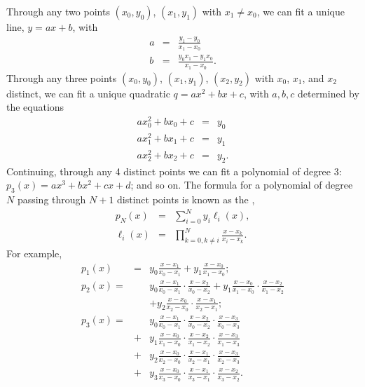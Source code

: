 \begin{sidebar}[Interpolation]
\label{sb.interpolation}
\noindent Through any two points $(x_{0},y_{0})$, $(x_{1},y_{1})$ with $x_{1}\neq x_{0}$, we can fit a unique line, $y=ax+b$, with
\begin{eqnarray*}
	a &=&  \frac{y_{1}-y_{0}}{x_{1}-x_{0}}\\
	b &=&  \frac{y_{0}x_{1} - y_{1}x_{0}}{x_{1}-x_{0}}.
\end{eqnarray*}
Through any three points $(x_{0},y_{0})$, $(x_{1},y_{1})$, $(x_{2},y_{2})$ with $x_{0}$, $x_{1}$, and $x_{2}$ distinct, we can fit a unique quadratic $q = ax^{2}+bx+c$, with $a,b,c$ determined by the equations
\begin{eqnarray*}
a x_{0}^{2} + b x_{0} + c &=& y_{0}\\
a x_{1}^{2} + b x_{1} + c &=& y_{1}\\
a x_{2}^{2} + b x_{2} + c &=& y_{2}.
\end{eqnarray*}
Continuing, through any 4 distinct points we can fit a polynomial of degree 3: $p_{3}(x) = ax^{3} + bx^{2} + cx +d$; and so on. The formula for a polynomial of degree $N$ passing through $N+1$ distinct points is known as the , 
\begin{eqnarray}
p_{N}(x) &=& \sum_{i=0}^{N} y_{i}\ell_{i}(x),\\
\ell_{i}(x) &=& \prod_{k=0,k\neq i}^{N} \frac{x-x_{k}}{x_{i}-x_{k}}.
\end{eqnarray}
For example,
\begin{eqnarray}
\label{e.lagrange-one}
p_{1}(x) &=& y_{0}\frac{x-x_{1}}{x_{0}-x_{1}} + y_{1}\frac{x-x_{0}}{x_{1}-x_{0}};\\
\label{e.lagrange-three}
p_{2}(x) =&& y_{0}\frac{x-x_{1}}{x_{0}-x_{1}}\cdot\frac{x-x_{2}}{x_{0}-x_{2}} 
	+ y_{1}\frac{x-x_{0}}{x_{1}-x_{0}}\cdot\frac{x-x_{2}}{x_{1}-x_{2}}\nonumber\\
	&&+ y_{2}\frac{x-x_{0}}{x_{2}-x_{0}}\cdot\frac{x-x_{1}}{x_{2}-x_{1}};\\
\label{e.lagrange-four}
p_{3}(x) =&&  y_{0}\frac{x-x_{1}}{x_{0}-x_{1}}\cdot\frac{x-x_{2}}{x_{0}-x_{2}}\cdot\frac{x-x_{3}}{x_{0}-x_{3}} \nonumber\\
      &+& y_{1}\frac{x-x_{0}}{x_{1}-x_{0}}\cdot\frac{x-x_{2}}{x_{1}-x_{2}}\cdot\frac{x-x_{3}}{x_{1}-x_{3}} \nonumber \\
      &+& y_{2}\frac{x-x_{0}}{x_{2}-x_{0}}\cdot\frac{x-x_{1}}{x_{2}-x_{1}}\cdot\frac{x-x_{3}}{x_{2}-x_{3}} \nonumber\\
      &+& y_{3}\frac{x-x_{0}}{x_{3}-x_{0}}\cdot\frac{x-x_{1}}{x_{3}-x_{1}}\cdot\frac{x-x_{2}}{x_{3}-x_{2}}.
\end{eqnarray}
\end{sidebar}

